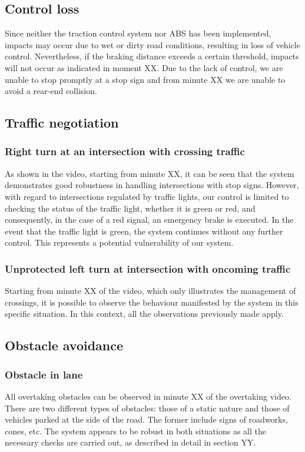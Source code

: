 \documentclass{article}
\begin{document}
\subsection{Control loss}
Since neither the traction control system nor ABS has been implemented, impacts may occur due to wet or dirty road conditions, 
resulting in loss of vehicle control. Nevertheless, if the braking distance exceeds a certain threshold, impacts will not occur as 
indicated in moment XX. Due to the lack of control, we are unable to stop promptly at a stop sign and from minute XX we are unable to avoid a rear-end collision.

\subsection{Traffic negotiation}
\subsubsection{Right turn at an intersection with crossing traffic}
As shown in the video, starting from minute XX, it can be seen that the system demonstrates good robustness in handling intersections with stop signs. However, 
with regard to intersections regulated by traffic lights, our control is limited to checking the status of the traffic light, whether it is green or red, and 
consequently, in the case of a red signal, an emergency brake is executed. In the event that the traffic light is green, the system continues without any 
further control. This represents a potential vulnerability of our system.
\subsubsection{Unprotected left turn at intersection with oncoming traffic}
Starting from minute XX of the video, which only illustrates the management of crossings, it is possible to observe the behaviour manifested by the system in 
this specific situation. In this context, all the observations previously made apply.

\subsection{Obstacle avoidance}
\subsubsection{Obstacle in lane}
All overtaking obstacles can be observed in minute XX of the overtaking video. There are two different types of obstacles: those of a static nature and 
those of vehicles parked at the side of the road. The former include signs of roadworks, cones, etc. The system appears to be robust in both situations 
as all the necessary checks are carried out, as described in detail in section YY.
\end{document}
